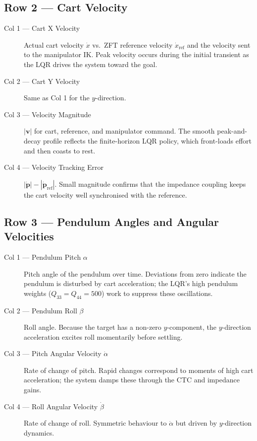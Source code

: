 \documentclass[11pt, a4paper]{article}
\begin{document}
\subsection*{Row 2 — Cart Velocity}

\begin{description}
  \item[Col 1 — Cart X Velocity]
    Actual cart velocity $\dot{x}$ vs.\ ZFT reference velocity $\dot{x}_{\mathrm{ref}}$
    and the velocity sent to the manipulator IK.
    Peak velocity occurs during the initial transient as the LQR
    drives the system toward the goal.

  \item[Col 2 — Cart Y Velocity]
    Same as Col 1 for the $y$-direction.

  \item[Col 3 — Velocity Magnitude]
    $|\bm{v}|$ for cart, reference, and manipulator command.
    The smooth peak-and-decay profile reflects the finite-horizon LQR
    policy, which front-loads effort and then coasts to rest.

  \item[Col 4 — Velocity Tracking Error]
    $|\dot{\bm{p}}| - |\dot{\bm{p}}_{\mathrm{ref}}|$.
    Small magnitude confirms that the impedance coupling keeps
    the cart velocity well synchronised with the reference.
\end{description}

\subsection*{Row 3 — Pendulum Angles and Angular Velocities}

\begin{description}
  \item[Col 1 — Pendulum Pitch $\alpha$]
    Pitch angle of the pendulum over time.
    Deviations from zero indicate the pendulum is disturbed by cart acceleration;
    the LQR's high pendulum weights ($Q_{33} = Q_{44} = 500$) work to
    suppress these oscillations.

  \item[Col 2 — Pendulum Roll $\beta$]
    Roll angle.  Because the target has a non-zero $y$-component, the $y$-direction
    acceleration excites roll momentarily before settling.

  \item[Col 3 — Pitch Angular Velocity $\dot{\alpha}$]
    Rate of change of pitch.  Rapid changes correspond to moments of high
    cart acceleration; the system damps these through the CTC and impedance gains.

  \item[Col 4 — Roll Angular Velocity $\dot{\beta}$]
    Rate of change of roll.  Symmetric behaviour to $\dot{\alpha}$ but
    driven by $y$-direction dynamics.
\end{description}
\end{document}
